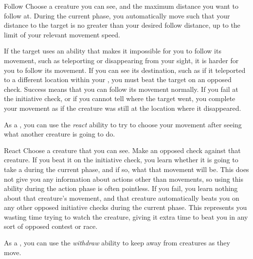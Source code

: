         \begin{activeability}{Follow}
            \rankline
            Choose a creature you can see, and the maximum distance you want to follow at.
            During the current phase, you automatically move such that your distance to the target is no greater than your desired follow distance, up to the limit of your relevant movement speed.

            If the target uses an ability that makes it impossible for you to follow its movement, such as teleporting or disappearing from your sight, it is harder for you to follow its movement.
            If you can see its destination, such as if it teleported to a different location within your , you must beat the target on an opposed  check.
            Success means that you can follow its movement normally.
            If you fail at the initiative check, or if you cannot tell where the target went, you complete your movement as if the creature was still at the location where it disappeared.
        \end{activeability}

        \label{React} As a , you can use the \textit{react} ability to try to choose your movement after seeing what another creature is going to do.

        \begin{activeability}{React}
            \rankline
            Choose a creature that you can see.
            Make an opposed  check against that creature.
            If you beat it on the initiative check, you learn whether it is going to take a  during the current phase, and if so, what that movement will be.
            This does not give you any information about actions other than movements, so using this ability during the action phase is often pointless.
            If you fail, you learn nothing about that creature's movement, and that creature automatically beats you on any other opposed initiative checks during the current phase.
            This represents you wasting time trying to watch the creature, giving it extra time to beat you in any sort of opposed contest or race.
        \end{activeability}

        \label{Withdraw} As a , you can use the \textit{withdraw} ability to keep away from creatures as they move.

